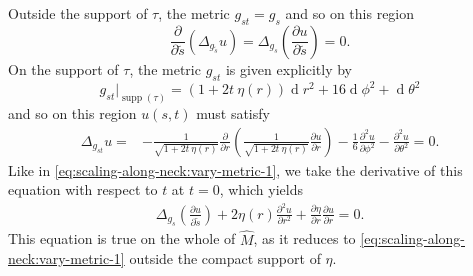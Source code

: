 \documentclass[preprint,12pt]{elsarticle}
\numberwithin{table}{section}
\newcommand{\del}{\partial}
\renewcommand{\d}{\operatorname{d}\!}
\begin{document}
Outside the support of $\tau$, the metric $g_{st} = g_s$ and so on this region
\begin{equation}
	\label{eq:scaling-along-neck:vary-metric-1}
	\frac{\del}{\del \tilde s} \left(\Delta_{g_{\tilde s}} u\right)
=
\Delta_{g_{s}} \left(
	\frac{\del u }{\del \tilde s}
\right)
= 0.
\end{equation}
On the support of $\tau$, the metric $g_{st}$ is given explicitly by
$$
g_{st}|_{\operatorname{supp}(\tau)} = (1 + 2 t \: \eta(r)) \d r^2 + 16 \d \phi^2 + \d \theta^2
$$
and so on this region $u(s,t)$ must satisfy
\begin{align}
	\Delta_{g_{st}} u 
	=& 
	- \frac{1}{\sqrt{1 + 2 t \: \eta(r)}}\frac{\del}{\del r} 
	\left(\frac{1}{\sqrt{1 + 2 t \: \eta(r)}}\frac{\del u}{\del r} \right) 
	-\frac{1}{6}\frac{\del^2 u}{\del \phi^2} 
	-\frac{\del^2 u}{\del \theta^2} 
	= 0.
\end{align}
Like in \cref{eq:scaling-along-neck:vary-metric-1}, we take the derivative of this equation with respect to $t$ at $t=0$, which yields
\begin{align}
	\label{eq:scaling-along-neck:vary-metric-2}
	\Delta_{g_{s}} \left(
		\frac{\del u}{\del \tilde s}
	\right)
	+ 2 \eta (r)
	\frac{\del^2 u}{\del r^2}
	+\frac{\del \eta}{\del r} 
	 \frac{\del u}{\del r}
	= 0.
\end{align}
This equation is true on the whole of $\hat M$, as it reduces to \cref{eq:scaling-along-neck:vary-metric-1} outside the compact support of $\eta$.
\end{document}
